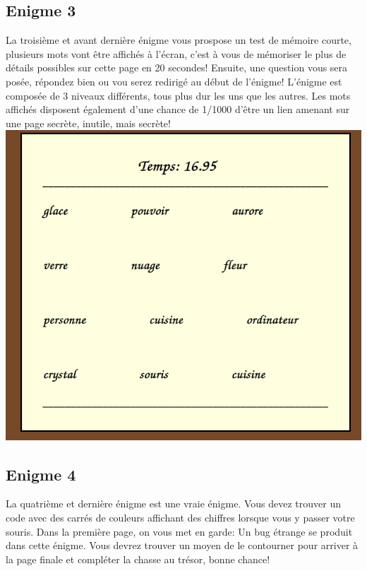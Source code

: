 \documentclass[12pt,a4paper]{article}
\begin{document}
\newpage
\subsection{Enigme 3}
La troisième et avant dernière énigme vous prospose un test de mémoire courte, plusieurs mots vont être affichés à l'écran, c'est à vous de mémoriser le plus de détails possibles sur cette page en 20 secondes! Ensuite, une question vous sera posée, répondez bien ou vou serez redirigé au début de l'énigme! L'énigme est composée de 3 niveaux différents, tous plus dur les uns que les autres. Les mots affichés disposent également d'une chance de 1/1000 d'être un lien amenant sur une page secrète, inutile, mais secrète! \\

\includegraphics[scale=0.5]{enigme3.png}

\newpage
\subsection{Enigme 4}
La quatrième et dernière énigme est une vraie énigme. Vous devez trouver un code avec des carrés de couleurs affichant des chiffres lorsque vous y passer votre souris. Dans la première page, on vous met en garde: Un bug étrange se produit dans cette énigme. Vous devrez trouver un moyen de le contourner pour arriver à la page finale et compléter la chasse au trésor, bonne chance! \\
\end{document}
